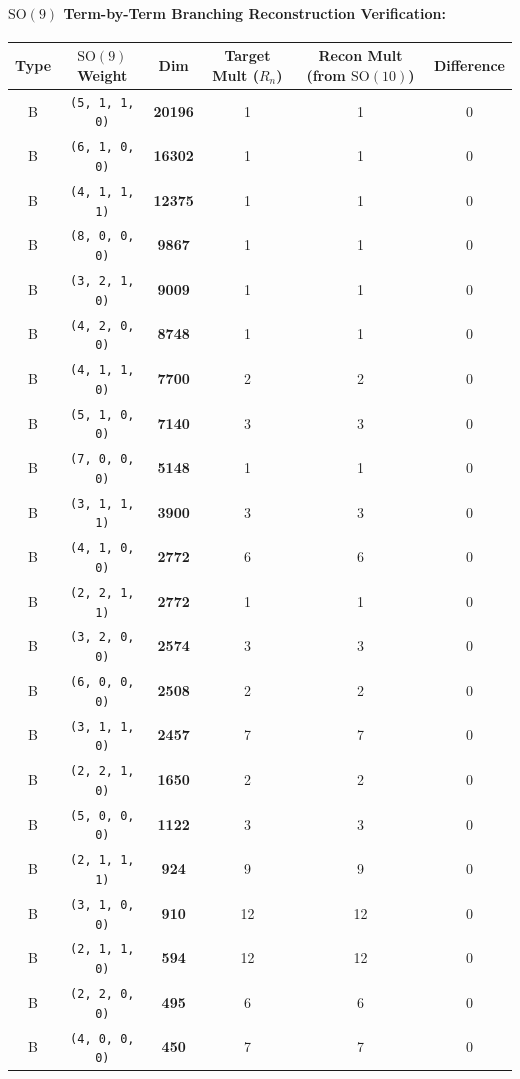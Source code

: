\documentclass[11pt,a4paper]{article}
\begin{document}
\paragraph{$\mathrm{SO}(9)$ Term-by-Term Branching Reconstruction Verification:}
\begin{longtable}{@{}cccccc@{}}
\toprule
Type & $\mathrm{SO}(9)$ Weight & Dim & Target Mult ($R_n$) & Recon Mult (from $\mathrm{SO}(10)$) & Difference \\
\midrule
\endhead
B & \texttt{(5, 1, 1, 0)} & \textbf{20196} & 1 & 1 & 0 \\
B & \texttt{(6, 1, 0, 0)} & \textbf{16302} & 1 & 1 & 0 \\
B & \texttt{(4, 1, 1, 1)} & \textbf{12375} & 1 & 1 & 0 \\
B & \texttt{(8, 0, 0, 0)} & \textbf{9867} & 1 & 1 & 0 \\
B & \texttt{(3, 2, 1, 0)} & \textbf{9009} & 1 & 1 & 0 \\
B & \texttt{(4, 2, 0, 0)} & \textbf{8748} & 1 & 1 & 0 \\
B & \texttt{(4, 1, 1, 0)} & \textbf{7700} & 2 & 2 & 0 \\
B & \texttt{(5, 1, 0, 0)} & \textbf{7140} & 3 & 3 & 0 \\
B & \texttt{(7, 0, 0, 0)} & \textbf{5148} & 1 & 1 & 0 \\
B & \texttt{(3, 1, 1, 1)} & \textbf{3900} & 3 & 3 & 0 \\
B & \texttt{(4, 1, 0, 0)} & \textbf{2772} & 6 & 6 & 0 \\
B & \texttt{(2, 2, 1, 1)} & \textbf{2772} & 1 & 1 & 0 \\
B & \texttt{(3, 2, 0, 0)} & \textbf{2574} & 3 & 3 & 0 \\
B & \texttt{(6, 0, 0, 0)} & \textbf{2508} & 2 & 2 & 0 \\
B & \texttt{(3, 1, 1, 0)} & \textbf{2457} & 7 & 7 & 0 \\
B & \texttt{(2, 2, 1, 0)} & \textbf{1650} & 2 & 2 & 0 \\
B & \texttt{(5, 0, 0, 0)} & \textbf{1122} & 3 & 3 & 0 \\
B & \texttt{(2, 1, 1, 1)} & \textbf{924} & 9 & 9 & 0 \\
B & \texttt{(3, 1, 0, 0)} & \textbf{910} & 12 & 12 & 0 \\
B & \texttt{(2, 1, 1, 0)} & \textbf{594} & 12 & 12 & 0 \\
B & \texttt{(2, 2, 0, 0)} & \textbf{495} & 6 & 6 & 0 \\
B & \texttt{(4, 0, 0, 0)} & \textbf{450} & 7 & 7 & 0 \\

\end{longtable}
\end{document}
